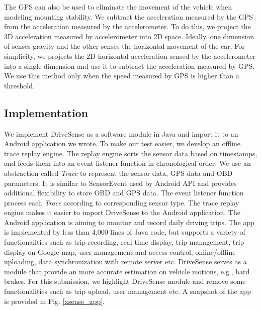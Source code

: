 The GPS can also be used to eliminate the movement of the vehicle
when modeling mounting stability. 
We subtract the acceleration measured by the GPS from
the acceleration measured by the accelerometer. 
To do this, we project the 3D acceleration measured
by accelerometer into 2D space. 
Ideally, one dimension of senses gravity and the other
senses the horizontal movement of the car. 
For simplicity, we projects the 2D horizontal 
acceleration sensed by the accelerometer
into a single dimension and use it to subtract the acceleration
measured by GPS. 
We use this method only when the speed measured by GPS
is higher than a threshold. 


\subsection{Implementation}


We implement DriveSense as a software module in Java and 
import it to an Android application we wrote.
To make our test easier, we develop an offline 
trace replay engine.
The replay engine sorts the sensor data
based on timestamps, and feeds them into an event listener function in chronological order. 
We use an abstraction called \emph{Trace} to represent the sensor data, 
GPS data and OBD parameters.
It is similar to SensorEvent used by Android API \cite{sensor}
and provides additional flexibility to store OBD and GPS data. 
The event listener function process each \emph{Trace} 
according to corresponding sensor type.  
The trace replay engine makes it easier to import
DriveSense to the Android application. 
The Android application is aiming to monitor and record
daily driving trips. 
The app is implemented by less than 4,000 lines of Java code, 
but supports a variety of functionalities such as
trip recording, real time display, trip management,
trip display on Google map, user management and access control, 
online/offline uploading, data synchronization with remote server etc. 
DriveSense serves as a module that provide an more accurate
estimation on vehicle motions, e.g., hard brakes. 
For this submission, we highlight DriveSense module 
and remove some functionalities such as
trip upload, user management etc.
A snapshot of the app is provided in Fig. \ref{xsense_app}. 

